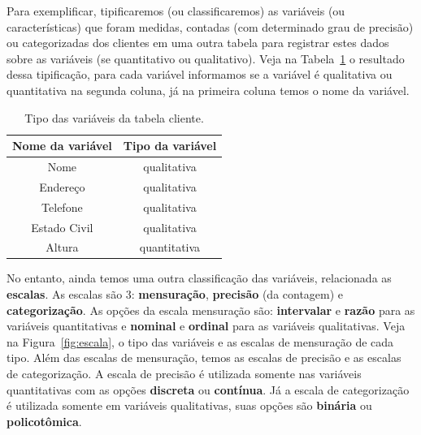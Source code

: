 Para exemplificar, tipificaremos (ou classificaremos) as variáveis (ou  características) que foram medidas, contadas (com determinado grau de precisão) ou categorizadas dos clientes em uma outra tabela para registrar estes dados sobre as variáveis (se quantitativo ou qualitativo). Veja na Tabela~\ref{tblclienteclassificacao} o resultado dessa tipificação, para cada variável informamos se a variável é qualitativa ou quantitativa na segunda coluna, já na primeira coluna temos o nome da variável.

\begin{table}
	\centering
	\caption{Tipo das variáveis da tabela cliente.}
	\begin{tabular}{|c|c|}
		\hline
		\textbf{Nome da variável} &\textbf{Tipo da variável} \\
		\hline
		Nome & qualitativa \\
		\hline
		Endereço & qualitativa \\
		\hline
		Telefone & qualitativa \\
		\hline
		Estado Civil & qualitativa \\
		\hline
		Altura & quantitativa \\
		\hline
	\end{tabular}
	\label{tblclienteclassificacao}
\end{table}

No entanto, ainda temos uma outra classificação das variáveis, relacionada as \textbf{escalas}. As escalas são 3: \textbf{mensuração}, \textbf{precisão} (da contagem) e \textbf{categorização}. As opções da escala mensuração são: \textbf{intervalar} e \textbf{razão} para as variáveis quantitativas e \textbf{nominal} e \textbf{ordinal} para as variáveis qualitativas. Veja na Figura~\ref{fig:escala}, o tipo das variáveis e as escalas de mensuração de cada tipo. Além das escalas de mensuração, temos as escalas de precisão e as escalas de categorização. A escala de precisão é utilizada somente nas variáveis quantitativas com as opções \textbf{discreta} ou \textbf{contínua}. Já a escala de categorização é utilizada somente em variáveis qualitativas, suas opções são \textbf{binária} ou \textbf{policotômica}.

